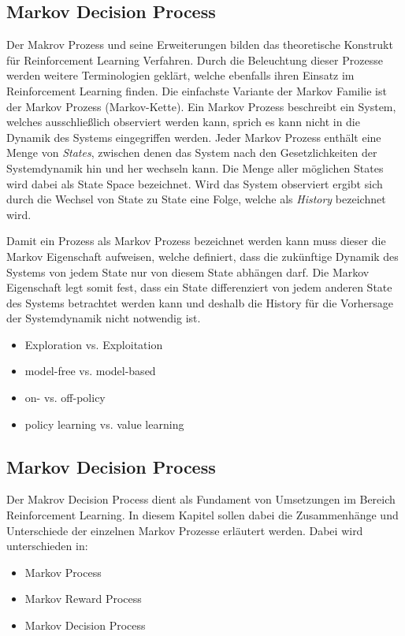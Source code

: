 \documentclass[11pt]{scrartcl}
\begin{document}
\subsection{Markov Decision Process}
Der Makrov Prozess und seine Erweiterungen bilden das theoretische Konstrukt für Reinforcement Learning
Verfahren. Durch die Beleuchtung dieser Prozesse werden weitere Terminologien geklärt, welche ebenfalls
ihren Einsatz im Reinforcement Learning finden. Die einfachste Variante der Markov Familie ist der 
Markov Prozess (Markov-Kette). Ein Markov Prozess beschreibt ein System, welches ausschließlich
observiert werden kann, sprich es kann nicht in die Dynamik des Systems eingegriffen werden. Jeder
Markov Prozess enthält eine Menge von \textit{States}, zwischen denen das System nach den
Gesetzlichkeiten der Systemdynamik hin und her wechseln kann. Die Menge aller möglichen States wird
dabei als State Space bezeichnet. Wird das System observiert ergibt sich durch die Wechsel von State zu 
State eine Folge, welche als \textit{History} bezeichnet wird. 

Damit ein Prozess als Markov Prozess bezeichnet werden kann muss dieser die Markov Eigenschaft aufweisen,
welche definiert, dass die zukünftige Dynamik des Systems von jedem State nur von diesem State abhängen 
darf. Die Markov Eigenschaft legt somit fest, dass ein State differenziert von jedem anderen State des
Systems betrachtet werden kann und deshalb die History für die Vorhersage der Systemdynamik nicht
notwendig ist.

\begin{itemize}
\itemsep0pt
\item Exploration vs. Exploitation
\item model-free vs. model-based
\item on- vs. off-policy
\item policy learning vs. value learning
\end{itemize}
\subsection{Markov Decision Process}
Der Makrov Decision Process dient als Fundament von Umsetzungen im Bereich Reinforcement Learning. In diesem Kapitel sollen dabei die Zusammenhänge und Unterschiede der einzelnen Markov Prozesse erläutert werden. Dabei wird unterschieden in:
\begin{itemize}
\itemsep0pt
\item Markov Process
\item Markov Reward Process
\item Markov Decision Process 
\end{itemize}
\end{document}
